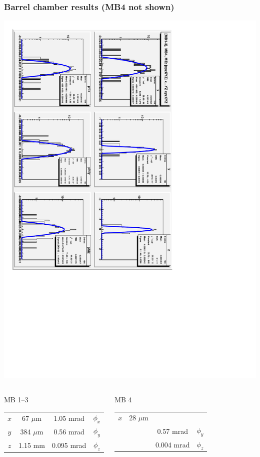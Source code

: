 \documentclass[compress]{beamer}
\begin{document}
\begin{frame}
\frametitle{Barrel chamber results \hfill {\small (MB4 not shown)}}
\vspace{-0.25 cm}
\begin{center}
\includegraphics[height=0.7\linewidth, angle=90]{optimal_barrel_alignment.pdf}
\end{center}

\vspace{-0.75 cm}
\begin{columns}
\begin{center}
MB 1--3
\begin{tabular}{c c | c c}
\hline\hline
$x$ & 67 $\mu$m & 1.05 mrad & $\phi_x$ \\
$y$ & 384 $\mu$m & 0.56 mrad & $\phi_y$ \\
$z$ & 1.15 mm & 0.095 mrad & $\phi_z$ \\
\hline\hline
\end{tabular}
\end{center}

\begin{center}
MB 4
\begin{tabular}{c c | c c}
\hline\hline
$x$ & 28 $\mu$m &  \\
    &           & 0.57 mrad & $\phi_y$ \\
    &           & 0.004 mrad & $\phi_z$ \\
\hline\hline
\end{tabular}
\end{center}
\end{columns}
\end{frame}
\end{document}
